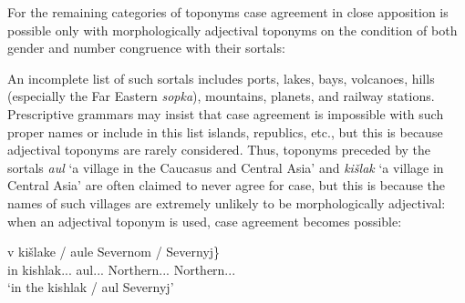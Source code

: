 \documentclass[output=paper,colorlinks,citecolor=brown]{langscibook}
\begin{document}
For the remaining categories of toponyms case agreement in close apposition is possible only with morphologically adjectival toponyms on the condition of both gender and number congruence with their sortals:

\ea\label{mat:ex:Bologoe-Moskva-Tixoreckaja}
\z
\z

\begin{sloppypar}
\noindent An incomplete list of such sortals includes ports, lakes, bays, volcanoes, hills (especially the Far Eastern \textit{sopka}), mountains, planets, and railway stations. Prescriptive grammars may insist that case agreement is impossible with such proper names or include in this list islands, republics, etc., but this is because adjectival toponyms are rarely considered. Thus, toponyms preceded by the sortals \textit{aul} ‘a village in the Caucasus and Central Asia’ and \textit{kišlak} ‘a village in Central Asia’ are often claimed to never agree for case, but this is because the names of such villages are extremely unlikely to be morphologically adjectival: when an adjectival toponym is used, case agreement becomes possible:
\end{sloppypar}

\ea\label{mat:ex:aul-Severnyj}
\gll v	kišlake / aule	\minsp{\{} Severnom / Severnyj\} \\
in	kishlak.{\MASC.\SG}.{\LOC} {} aul.{\MASC.\SG}.{\LOC}	{} Northern.{\MASC.\SG}.{\LOC} {} Northern.{\MASC.\SG.\NOM}\\
\glt `in the kishlak / aul Severnyj'
\z 
\end{document}
